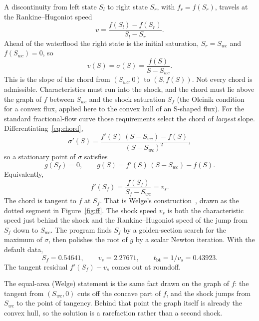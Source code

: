\documentclass[11pt]{article}
\begin{document}
A discontinuity from left state $S_l$ to right state $S_r$, with $f_r = f(S_r)$, travels at the Rankine--Hugoniot speed
\begin{equation}
\label{eq:rh}
v = \frac{f(S_l) - f(S_r)}{S_l - S_r}.
\end{equation}
Ahead of the waterflood the right state is the initial saturation, $S_r = S_{wc}$ and $f(S_{wc}) = 0$, so
\begin{equation}
\label{eq:chord}
v(S) = \sigma(S) = \frac{f(S)}{S - S_{wc}}.
\end{equation}
This is the slope of the chord from $(S_{wc}, 0)$ to $(S, f(S))$.
Not every chord is admissible.
Characteristics must run into the shock, and the chord must lie above the graph of $f$ between $S_{wc}$ and the shock saturation $S_f$ (the Oleinik condition~\cite{oleinik1959} for a convex flux, applied here to the convex hull of an S-shaped flux).
For the standard fractional-flow curve those requirements select the chord of \emph{largest} slope.
Differentiating~\eqref{eq:chord},
\begin{equation}
\label{eq:sigma-prime}
\sigma'(S)
=
\frac{f'(S)\,(S-S_{wc}) - f(S)}{(S-S_{wc})^2},
\end{equation}
so a stationary point of $\sigma$ satisfies
\begin{equation}
\label{eq:welge}
g(S_f) = 0,
\qquad
g(S) = f'(S)\,(S - S_{wc}) - f(S).
\end{equation}
Equivalently,
\begin{equation}
\label{eq:tangent}
f'(S_f) = \frac{f(S_f)}{S_f - S_{wc}} = v_s.
\end{equation}
The chord is tangent to $f$ at $S_f$.
That is Welge's construction~\cite{welge1952}, drawn as the dotted segment in Figure~\ref{fig:ff}.
The shock speed $v_s$ is both the characteristic speed just behind the shock and the Rankine--Hugoniot speed of the jump from $S_f$ down to $S_{wc}$.
The program finds $S_f$ by a golden-section search for the maximum of $\sigma$, then polishes the root of $g$ by a scalar Newton iteration.
With the default data,
\[
S_f = 0.54641,
\qquad
v_s = 2.27671,
\qquad
t_{\mathrm{bt}} = 1/v_s = 0.43923.
\]
The tangent residual $f'(S_f) - v_s$ comes out at roundoff.

The equal-area (Welge) statement is the same fact drawn on the graph of $f$: the tangent from $(S_{wc},0)$ cuts off the concave part of $f$, and the shock jumps from $S_{wc}$ to the point of tangency.
Behind that point the graph itself is already the convex hull, so the solution is a rarefaction rather than a second shock.
\end{document}
